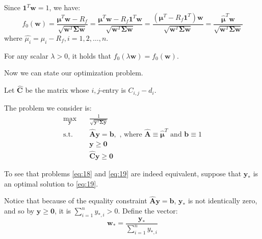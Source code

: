 \documentclass{beamer}
\begin{document}
\begin{frame}

\justifying
Since $\mathbf{1}^{T}\mathbf{w} = 1$, we have:
$$
f_{0}\left(\mathbf{w}\right) =  \frac{\boldsymbol\mu^{T} \mathbf{w} - R_{f}}{\sqrt{\mathbf{w}^{T}\mathbf{\Sigma}\mathbf{w}}} = \frac{\boldsymbol\mu^{T} \mathbf{w} - R_{f}\mathbf{1}^{T}\mathbf{w}}{\sqrt{\mathbf{w}^{T}\mathbf{\Sigma}\mathbf{w}}} = \frac{\left(\boldsymbol\mu^{T} - R_{f}\mathbf{1}^{T}\right)\mathbf{w}}{\sqrt{\mathbf{w}^{T}\mathbf{\Sigma}\mathbf{w}}} = \frac{\hat{\boldsymbol\mu}^{T}\mathbf{w}}{\sqrt{\mathbf{w}^{T}\mathbf{\Sigma}\mathbf{w}}}
$$
where $\hat{\mu_{i}} = \mu_{i} - R_{f}, i = 1,2,\dots,n$.

\vspace{0.8cm}
\justifying
For any scalar $\lambda > 0$, it holds that $f_{0}\left(\lambda\mathbf{w}\right) = f_{0}\left(\mathbf{w}\right)$.

\vspace{0.8cm}
\justifying
Now we can state our optimization problem.

\vspace{0.8cm}
\justifying
Let $\hat{\mathbf{C}}$ be the matrix whose $i,j$-entry is $C_{i,j} - d_{i}$.

\end{frame}



\begin{frame}


\justifying
The problem we consider is:
\justifying
\begin{equation}
\begin{aligned}
\label{eq:19}
\max_{\mathbf{y}} \quad & \frac{1}{\sqrt{\mathbf{y}^{T}\mathbf{\Sigma}\mathbf{y}}} \\
\textrm{s.t.} \quad & \hat{\mathbf{A}} \mathbf{y} = \mathbf{b}, \textrm{ , where } \hat{\mathbf{A}} \equiv \hat{\boldsymbol\mu}^{T} \textrm{ and } \mathbf{b} \equiv 1  \\
                             & \mathbf{y} \geq \mathbf{0} \\
                             & \hat{\mathbf{C}}\mathbf{y} \geq \mathbf{0}
\end{aligned}
\end{equation}

\vspace{0.6cm}
\justifying
To see that problems \eqref{eq:18} and \eqref{eq:19} are indeed equivalent, suppose that $\mathbf{y}_{*}$ is an optimal solution to \eqref{eq:19}.

\vspace{0.6cm}
\justifying
Notice that because of the equality constraint $\hat{\mathbf{A}} \mathbf{y} = \mathbf{b}$, $\mathbf{y}_{*}$ is not identically zero, and so by $\mathbf{y} \geq \mathbf{0}$, it is $\sum_{i=1}^{n}y_{*,i} > 0$. Define the vector:
$$
\mathbf{w}_{*} =  \frac{\mathbf{y}_{*}}{\sum_{i=1}^{n}y_{*,i}}
$$


\end{frame}
\end{document}
